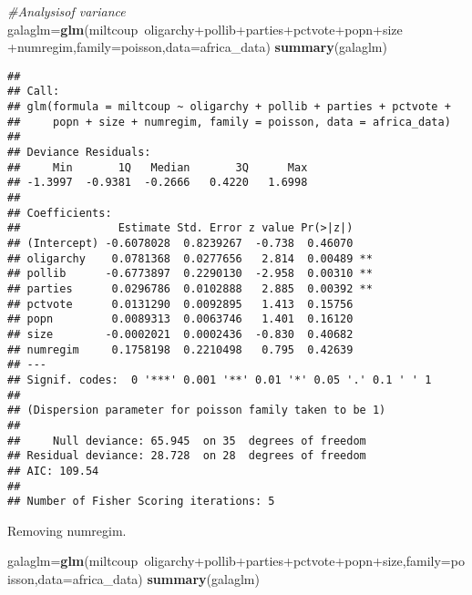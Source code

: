 \documentclass[11pt,]{article}
\newenvironment{Shaded}{\begin{snugshade}}{\end{snugshade}}
\newcommand{\KeywordTok}[1]{\textcolor[rgb]{0.13,0.29,0.53}{\textbf{{#1}}}}
\newcommand{\DataTypeTok}[1]{\textcolor[rgb]{0.13,0.29,0.53}{{#1}}}
\newcommand{\CommentTok}[1]{\textcolor[rgb]{0.56,0.35,0.01}{\textit{{#1}}}}
\newcommand{\NormalTok}[1]{{#1}}
\begin{document}
\begin{Shaded}
\begin{Highlighting}[]
\CommentTok{#Analysisof variance}
\NormalTok{galaglm=}\KeywordTok{glm}\NormalTok{(miltcoup~oligarchy+pollib+parties+pctvote+popn+size +numregim,}\DataTypeTok{family=}\NormalTok{poisson,}\DataTypeTok{data=}\NormalTok{africa_data)}
\KeywordTok{summary}\NormalTok{(galaglm)}
\end{Highlighting}
\end{Shaded}

\begin{verbatim}
## 
## Call:
## glm(formula = miltcoup ~ oligarchy + pollib + parties + pctvote + 
##     popn + size + numregim, family = poisson, data = africa_data)
## 
## Deviance Residuals: 
##     Min       1Q   Median       3Q      Max  
## -1.3997  -0.9381  -0.2666   0.4220   1.6998  
## 
## Coefficients:
##               Estimate Std. Error z value Pr(>|z|)   
## (Intercept) -0.6078028  0.8239267  -0.738  0.46070   
## oligarchy    0.0781368  0.0277656   2.814  0.00489 **
## pollib      -0.6773897  0.2290130  -2.958  0.00310 **
## parties      0.0296786  0.0102888   2.885  0.00392 **
## pctvote      0.0131290  0.0092895   1.413  0.15756   
## popn         0.0089313  0.0063746   1.401  0.16120   
## size        -0.0002021  0.0002436  -0.830  0.40682   
## numregim     0.1758198  0.2210498   0.795  0.42639   
## ---
## Signif. codes:  0 '***' 0.001 '**' 0.01 '*' 0.05 '.' 0.1 ' ' 1
## 
## (Dispersion parameter for poisson family taken to be 1)
## 
##     Null deviance: 65.945  on 35  degrees of freedom
## Residual deviance: 28.728  on 28  degrees of freedom
## AIC: 109.54
## 
## Number of Fisher Scoring iterations: 5
\end{verbatim}

Removing numregim.

\begin{Shaded}
\begin{Highlighting}[]
\NormalTok{galaglm=}\KeywordTok{glm}\NormalTok{(miltcoup~oligarchy+pollib+parties+pctvote+popn+size,}\DataTypeTok{family=}\NormalTok{poisson,}\DataTypeTok{data=}\NormalTok{africa_data)}
\KeywordTok{summary}\NormalTok{(galaglm)}
\end{Highlighting}
\end{Shaded}
\end{document}
